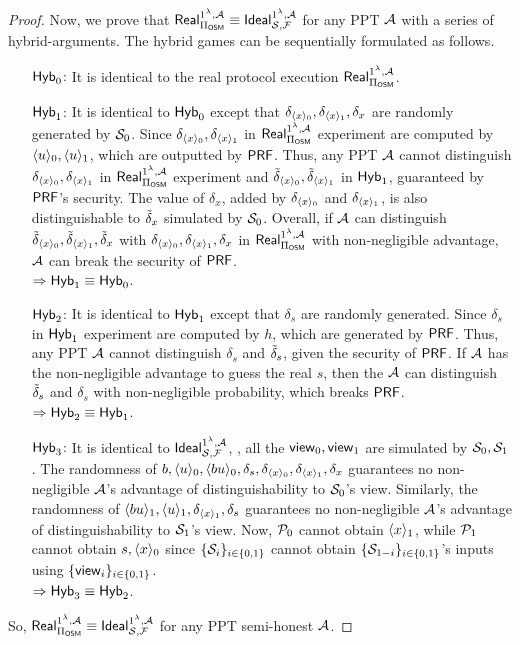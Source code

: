 \begin{proof}
	Now, we prove that $\mathsf{Real}^{1^\lambda,\mathcal{A}}_{\Pi_{\mathsf{OSM}}}\equiv\mathsf{Ideal}^{1^\lambda, \mathcal{A}}_{\mathcal{S}, \mathcal{F}}$ for any PPT $\mathcal{A}$ with a series of hybrid-arguments.
	The hybrid games can be sequentially formulated as follows.
\begin{itemize}
		 \item[$\mathsf{Hyb}_0$:] It is identical to the real protocol execution $\mathsf{Real}^{1^\lambda,\mathcal{A}}_{\Pi_{\mathsf{OSM}}}$.
		 \item[$\mathsf{Hyb}_{1}$:] It is identical to $\mathsf{Hyb}_0$ except that $\delta_{\langle x\rangle_0},\delta_{\langle x\rangle_1},\delta_{x}$ are randomly generated 
		 by $\mathcal{S}_0$.
		 Since $\delta_{\langle x\rangle_0},\delta_{\langle x\rangle_1}$ in $\mathsf{Real}^{1^\lambda,\mathcal{A}}_{\Pi_{\mathsf{OSM}}}$ experiment are computed by $\langle u \rangle_0,\langle u \rangle_1$, which are outputted by $\mathsf{PRF}$.
		 Thus, any PPT $\mathcal{A}$ cannot distinguish $\delta_{\langle x\rangle_0},\delta_{\langle x\rangle_1}$ in $\mathsf{Real}^{1^\lambda,\mathcal{A}}_{\Pi_{\mathsf{OSM}}}$ experiment and $\Tilde{\delta}_{\langle x\rangle_0},\Tilde{\delta}_{\langle x\rangle_1}$ in $\mathsf{Hyb}_1$, guaranteed by $\mathsf{PRF}$'s security.
		 The value of $\delta_x$, added by $\delta_{\langle x\rangle_0}$ and $\delta_{\langle x\rangle_1}$, is also distinguishable to $\Tilde{\delta}_x$ simulated by $\mathcal{S}_0$.
		 Overall, if $\mathcal{A}$ can distinguish $\Tilde{\delta}_{\langle x\rangle_0},\Tilde{\delta}_{\langle x\rangle_1},\Tilde{\delta}_x$ with $\delta_{\langle x\rangle_0},\delta_{\langle x\rangle_1},\delta_x$ in $\mathsf{Real}^{1^\lambda,\mathcal{A}}_{\Pi_{\mathsf{OSM}}}$ with non-negligible advantage, $\mathcal{A}$ can break the security of $\mathsf{PRF}$.
		 \\
		 $\Rightarrow \mathsf{Hyb}_1\equiv\mathsf{Hyb}_0$.
		 \item[$\mathsf{Hyb}_{2}$:] It is identical to $\mathsf{Hyb}_1$ except that $\delta_{s}$ are randomly generated.
		 Since $\delta_s$ in $\mathsf{Hyb}_1$ experiment are computed by $h$, which are generated by $\mathsf{PRF}$.
		 Thus, any PPT $\mathcal{A}$ cannot distinguish $\delta_s$ and $\Tilde{\delta}_{s}$, given the security of $\mathsf{PRF}$.
		If $\mathcal{A}$ has the non-negligible advantage to guess the real $s$, then the $\mathcal{A}$ can distinguish $\Tilde{\delta}_{s}$ and $\delta_s$ with non-negligible probability, which breaks $\mathsf{PRF}$.
		\\
		 $\Rightarrow \mathsf{Hyb}_2\equiv\mathsf{Hyb}_1$.
		 \item[$\mathsf{Hyb}_{3}$:] It is identical to $\mathsf{Ideal}^{1^\lambda, \mathcal{A}}_{\mathcal{S}, \mathcal{F}}$, \ie, all the $\mathsf{view}_0,\mathsf{view}_1$ 
		 are simulated by $\mathcal{S}_0,\mathcal{S}_1$.
		 The randomness of $b, \langle u \rangle_0, \langle bu \rangle_0,\delta_s, \allowbreak\delta_{\langle x\rangle_0},\delta_{\langle x\rangle_1},\allowbreak\delta_x$ 
		 guarantees no non-negligible $\mathcal{A}$'s advantage of distinguishability to $\mathcal{S}_0$'s view.
		 Similarly, the randomness of $\langle bu \rangle_1, \langle u \rangle_1, \allowbreak\delta_{\langle x\rangle_1}, \delta_s$ guarantees no non-negligible $\mathcal{A}$'s advantage of distinguishability to $\mathcal{S}_1$'s view.
		 Now, $\mathcal{P}_0$ cannot obtain $\langle x\rangle_1 $, while $\mathcal{P}_1$ cannot obtain $s,\langle x\rangle_0$ since $\{\mathcal{S}_i\}_{i\in\{0,1\}}$ cannot obtain $\{\mathcal{S}_{1-i}\}_{i\in\{0,1\}}$'s inputs using $\{\mathsf{view}_i\}_{i\in\{0,1\}}$.\\
		 $\Rightarrow \mathsf{Hyb}_3\equiv\mathsf{Hyb}_2$.
	 \end{itemize}
So,  $\mathsf{Real}^{1^\lambda,\mathcal{A}}_{\Pi_{\mathsf{OSM}}}\equiv\mathsf{Ideal}^{1^\lambda, \mathcal{A}}_{\mathcal{S}, \mathcal{F}}$ for any PPT semi-honest $\mathcal{A}$.	
\end{proof}

